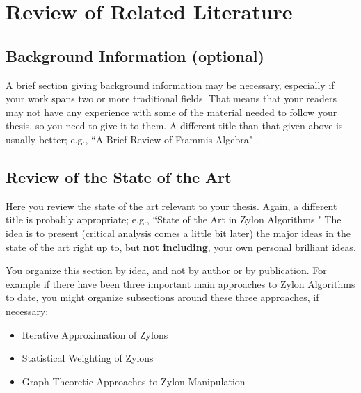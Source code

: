 \chapter{Review of Related Literature} \label{sec:back}




\section{Background Information (optional)}

A brief section giving background information may be necessary, especially
if your work spans two or more traditional fields. That means that your
readers may not have any experience with some of the material needed to
follow your thesis, so you need to give it to them. A different title than
that given above is usually better; e.g., ``A Brief Review of Frammis
Algebra" \cite{Vapnik}.

\section{Review of the State of the Art} \label{sec:StateoftheArt}

Here you review the state of the art relevant to your thesis. Again, a
different title is probably appropriate; e.g., ``State of the Art in Zylon
Algorithms." The idea is to present (critical analysis comes a little bit
later) the major ideas in the state of the art right up to, but \textbf{not
including}, your own personal brilliant ideas.

You organize this section by idea, and not by author or by publication.
For example if there have been three important main approaches to Zylon
Algorithms to date, you might organize subsections around these three
approaches, if necessary:

\begin{itemize}
\item Iterative Approximation of Zylons
\item Statistical Weighting of Zylons
\item Graph-Theoretic Approaches to Zylon Manipulation
\end{itemize}




